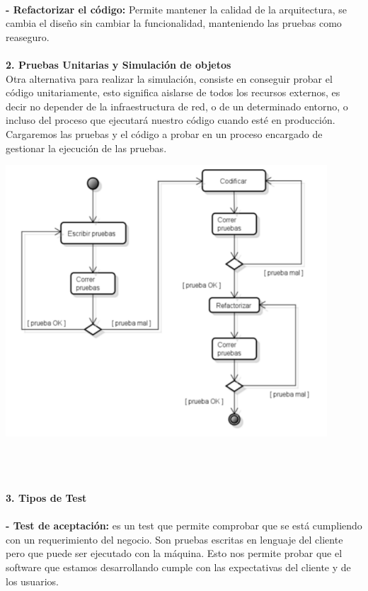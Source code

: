 \begin{flushleft}
\begin{itemize}
\textbf{}\\
\textbf{- Refactorizar el código:} Permite mantener la calidad de la arquitectura, se cambia el diseño sin cambiar la funcionalidad, manteniendo las pruebas como reaseguro.
\textbf{}\\
\textbf{}\\
\textbf{2.	Pruebas Unitarias y Simulación de objetos}
\textbf{}\\
Otra alternativa para realizar la simulación, consiste en conseguir probar el código unitariamente, esto significa aislarse de todos los recursos externos, es decir no depender de la infraestructura de red, o de un determinado entorno, o incluso del proceso que ejecutará nuestro código cuando esté en producción. Cargaremos las pruebas y el código a probar en un proceso encargado de gestionar la ejecución de las pruebas.
\begin{center}
    \includegraphics[width=12cm]{./Imagenes/TDD}
    \end{center}
\textbf{}\\
\textbf{}\\
\textbf{}\\
\textbf{3.	Tipos de Test}
\textbf{}\\
\textbf{}\\
\textbf{- Test de aceptación:} es un test que permite comprobar que se está cumpliendo con un requerimiento del negocio. Son pruebas escritas en lenguaje del cliente pero que puede ser ejecutado con la máquina. Esto nos permite probar que el software que estamos desarrollando cumple con las expectativas del cliente y de los usuarios.


\end{itemize}
\end{flushleft}
